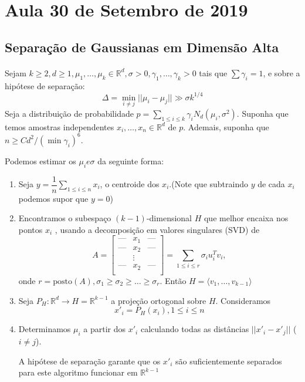 \section{Aula 30 de Setembro de 2019}
\label{2019_09_30}

\subsection{Separação de Gaussianas em Dimensão Alta}

\paragraph{} Sejam $k\ge 2, d \ge 1, \mu_1,\dots,\mu_k\in \mathbb{R}^d,\sigma >0, \gamma_1,\dots,\gamma_k>0$ tais que $\sum \gamma_i = 1$, e sobre a hip\'otese de separa\c{c}\~ao:
\[\Delta = \min_{i \neq j}\vert\vert\mu_i-\mu_j\vert\vert\gg \sigma k^{1/4}\]
Seja a distribui\c{c}\~ao de probabilidade $p=\displaystyle \sum_{1\le i\le k}\gamma_i N_d(\mu_i,\sigma^2)$. Suponha que temos amostras independentes $x_i,\dots,x_n \in \mathbb{R}^d$ de $p$. Ademais, suponha que $n\ge Cd^2/(\min \gamma_i )^6$.

Podemos estimar os $\mu_ie \sigma$ da seguinte forma:
\begin{enumerate}
\item Seja $y = \dfrac{1}{n}\displaystyle\sum_{1\le i\le n} x_i$, o centroide dos $x_i$.(Note que subtraindo $y$ de cada $x_i$ podemos supor que $y=0$)

\item Encontramos o subespa\c{c}o $(k-1)$-dimensional $H$ que melhor encaixa nos pontos $x_i$ , usando a decomposi\c{c}\~ao em valores singulares (SVD) de 
\[A = 
\begin{bmatrix}
    \text{---} & x_1 & \text{---} \\
    \text{---} & x_2 & \text{---}\\
     &\vdots &\\
    \text{---} & x_2 & \text{---}\\
\end{bmatrix} = \sum_{1\le i \le r} \sigma_iu_i^Tv_i,
\]
onde $r = \text{posto}(A), \sigma_1\ge\sigma_2\ge\dots\ge \sigma_r$.
Ent\~ao $H=\langle v_1,\ldots,v_{k-1} \rangle$

\item Seja $P_H: \mathbb{R}^d \to H=\mathbb{R}^{k-1}$ a proje\c{c}\~ao ortogonal sobre $H$. Consideramos \[x'_i = P_H(x_i), 1\le i \le n\]
\item Determinamos $\mu_i$ a partir dos $x'_i$ calculando todas as dist\^ancias $\vert\vert x'_i-x'_j\vert\vert$ ($i\neq j$).

A hip\'otese de separa\c{c}\~ao garante que os $x'_i$ s\~ao suficientemente separados para este algoritmo funcionar em $\mathbb{R}^{k-1}$
\end{enumerate}
